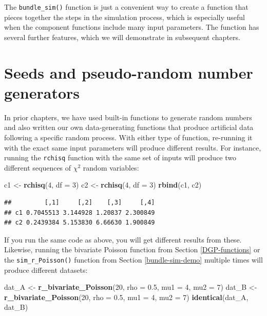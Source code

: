 \documentclass[
]{book}
\newenvironment{Shaded}{\begin{snugshade}}{\end{snugshade}}
\newcommand{\AttributeTok}[1]{\textcolor[rgb]{0.13,0.29,0.53}{#1}}
\newcommand{\DecValTok}[1]{\textcolor[rgb]{0.00,0.00,0.81}{#1}}
\newcommand{\FloatTok}[1]{\textcolor[rgb]{0.00,0.00,0.81}{#1}}
\newcommand{\FunctionTok}[1]{\textcolor[rgb]{0.13,0.29,0.53}{\textbf{#1}}}
\newcommand{\NormalTok}[1]{#1}
\newcommand{\OtherTok}[1]{\textcolor[rgb]{0.56,0.35,0.01}{#1}}
\begin{document}
The \texttt{bundle\_sim()} function is just a convenient way to create a function that pieces together the steps in the simulation process, which is especially useful when the component functions include many input parameters.
The function has several further features, which we will demonstrate in subsequent chapters.

\section{Seeds and pseudo-random number generators}\label{seeds-and-pseudo-RNGs}

In prior chapters, we have used built-in functions to generate random numbers and also written our own data-generating functions that produce artificial data following a specific random process.
With either type of function, re-running it with the exact same input parameters will produce different results.
For instance, running the \texttt{rchisq} function with the same set of inputs will produce two different sequences of \(\chi^2\) random variables:

\begin{Shaded}
\begin{Highlighting}[]
\NormalTok{c1 }\OtherTok{\textless{}{-}} \FunctionTok{rchisq}\NormalTok{(}\DecValTok{4}\NormalTok{, }\AttributeTok{df =} \DecValTok{3}\NormalTok{)}
\NormalTok{c2 }\OtherTok{\textless{}{-}} \FunctionTok{rchisq}\NormalTok{(}\DecValTok{4}\NormalTok{, }\AttributeTok{df =} \DecValTok{3}\NormalTok{)}
\FunctionTok{rbind}\NormalTok{(c1, c2)}
\end{Highlighting}
\end{Shaded}

\begin{verbatim}
##         [,1]     [,2]    [,3]     [,4]
## c1 0.7045513 3.144928 1.20837 2.300849
## c2 0.2439384 5.153830 6.66630 1.900849
\end{verbatim}

If you run the same code as above, you will get different results from these.
Likewise, running the bivariate Poisson function from Section \ref{DGP-functions} or the \texttt{sim\_r\_Poisson()} function from Section \ref{bundle-sim-demo} multiple times will produce different datasets:

\begin{Shaded}
\begin{Highlighting}[]
\NormalTok{dat\_A }\OtherTok{\textless{}{-}} \FunctionTok{r\_bivariate\_Poisson}\NormalTok{(}\DecValTok{20}\NormalTok{, }\AttributeTok{rho =} \FloatTok{0.5}\NormalTok{, }\AttributeTok{mu1 =} \DecValTok{4}\NormalTok{, }\AttributeTok{mu2 =} \DecValTok{7}\NormalTok{)}
\NormalTok{dat\_B }\OtherTok{\textless{}{-}} \FunctionTok{r\_bivariate\_Poisson}\NormalTok{(}\DecValTok{20}\NormalTok{, }\AttributeTok{rho =} \FloatTok{0.5}\NormalTok{, }\AttributeTok{mu1 =} \DecValTok{4}\NormalTok{, }\AttributeTok{mu2 =} \DecValTok{7}\NormalTok{)}
\FunctionTok{identical}\NormalTok{(dat\_A, dat\_B)}
\end{Highlighting}
\end{Shaded}
\end{document}
